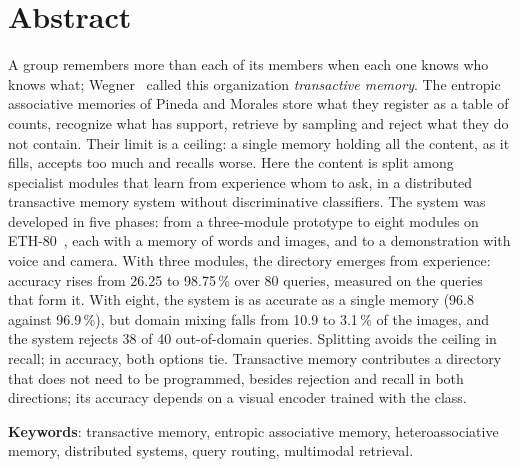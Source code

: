 \chapter*{Abstract}
\thispagestyle{empty}
A group remembers more than each of its members when each one knows who knows what;
Wegner~\cite{wegner1987transactive} called this organization \emph{transactive memory}.
The entropic associative memories of Pineda and Morales
\cite{pineda2022weighted,morales2025missing} store what they register as a table of
counts, recognize what has support, retrieve by sampling and reject what they do not
contain.
Their limit is a ceiling: a single memory holding all the content, as it fills, accepts
too much and recalls worse.
Here the content is split among specialist modules that learn from experience whom to
ask, in a distributed transactive memory system without discriminative classifiers.
The system was developed in five phases: from a three-module prototype to eight modules
on ETH-80~\cite{leibe2003eth80}, each with a memory of words and images, and to a
demonstration with voice and camera.
With three modules, the directory emerges from experience: accuracy rises from 26.25 to
98.75\,\% over 80 queries, measured on the queries that form it.
With eight, the system is as accurate as a single memory (96.8 against 96.9\,\%), but
domain mixing falls from 10.9 to 3.1\,\% of the images, and the system rejects 38 of 40
out-of-domain queries.
Splitting avoids the ceiling in recall; in accuracy, both options tie.
Transactive memory contributes a directory that does not need to be programmed, besides rejection and recall in both directions; its accuracy depends on a visual encoder trained with the
class.


\noindent\textbf{Keywords}: transactive memory, entropic associative memory, heteroassociative
memory, distributed systems, query routing, multimodal retrieval.
